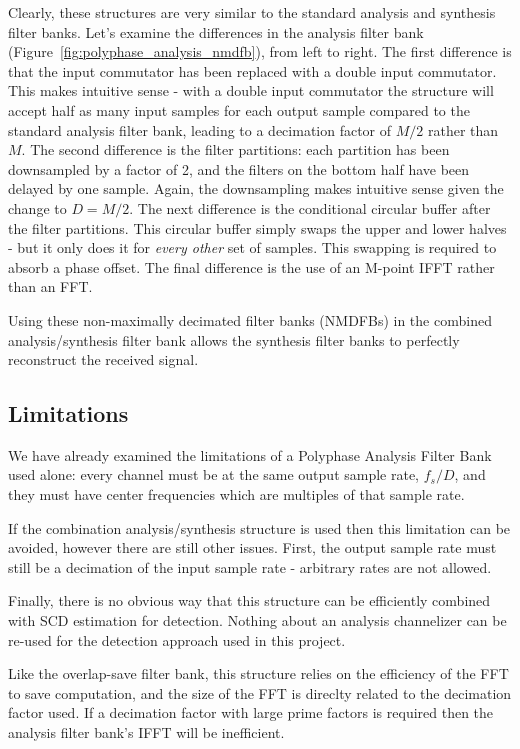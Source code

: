\documentclass[12pt]{article}
\begin{document}
Clearly, these structures are very similar to the standard analysis and
synthesis filter banks. Let's examine the differences in the analysis filter
bank (Figure~\ref{fig:polyphase_analysis_nmdfb}), from left to right. The first
difference is that the input commutator has been replaced with a double input
commutator. This makes intuitive sense - with a double input commutator the
structure will accept half as many input samples for each output sample
compared to the standard analysis filter bank, leading to a decimation factor
of $M/2$ rather than $M$. The second difference is the filter partitions: each
partition has been downsampled by a factor of 2, and the filters on the bottom
half have been delayed by one sample.  Again, the downsampling makes intuitive
sense given the change to $D=M/2$. The next difference is the conditional
circular buffer after the filter partitions. This circular buffer simply swaps
the upper and lower halves - but it only does it for \emph{every other} set of
samples. This swapping is required to absorb a phase offset. The final
difference is the use of an M-point IFFT rather than an FFT\cite{Chen1}.

Using these non-maximally decimated filter banks (NMDFBs) in the combined
analysis/synthesis filter bank allows the synthesis filter banks to perfectly
reconstruct the received signal.

\subsection{Limitations}
\label{sec:poly_limitations}
We have already examined the limitations of a Polyphase Analysis
Filter Bank used alone: every channel must be at the same output sample
rate, $f_s/D$, and they must have center frequencies which are multiples of
that sample rate.

If the combination analysis/synthesis structure is used then this limitation
can be avoided, however there are still other issues. First, the output sample
rate must still be a decimation of the input sample rate - arbitrary rates are
not allowed. 

Finally, there is no obvious way that this structure can be efficiently
combined with SCD estimation for detection. Nothing about an analysis
channelizer can be re-used for the detection approach used in this project.

Like the overlap-save filter bank, this structure relies on the efficiency of
the FFT to save computation, and the size of the FFT is direclty related to
the decimation factor used. If a decimation factor with large prime factors is 
required then the analysis filter bank's IFFT will be inefficient.
\end{document}
